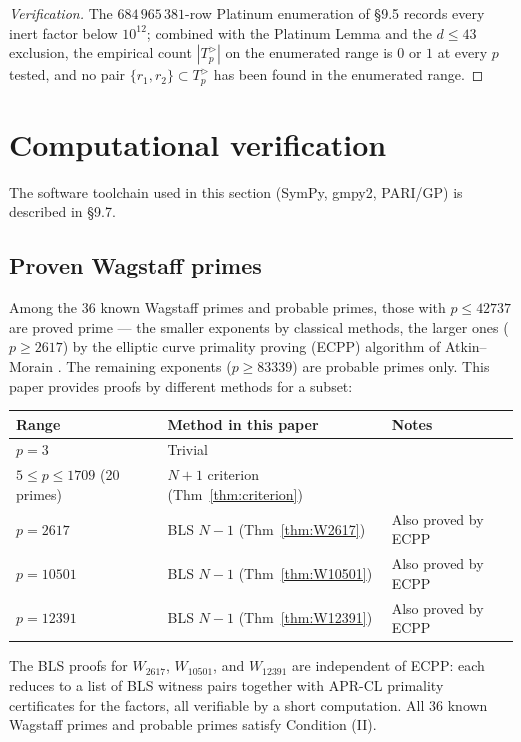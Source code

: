 \documentclass[12pt]{article}
\theoremstyle{plain}
\theoremstyle{definition}
\theoremstyle{remark}
\begin{document}
\begin{proof}[Verification]
The \(684\,965\,381\)-row Platinum enumeration of \S9.5 records
every inert factor below \(10^{12}\); combined with the
Platinum Lemma and the \(d \leq 43\) exclusion, the empirical
count \(|T_p^{>}|\) on the enumerated range is \(0\) or \(1\) at every
\(p\) tested, and no pair \(\{r_1, r_2\} \subset T_p^{>}\) has
been found in the enumerated range.
\end{proof}

\section{Computational verification}


The software toolchain used in this section (SymPy, gmpy2,
PARI/GP) is described in \S9.7.

\subsection{Proven Wagstaff primes}


Among the 36 known Wagstaff primes and probable primes, those with
\(p \leq 42737\) are proved prime --- the smaller exponents by
classical methods, the larger ones (\(p \geq 2617\)) by the
elliptic curve primality proving (ECPP) algorithm of Atkin--Morain
\cite{ref1}. The remaining exponents (\(p \geq 83339\)) are
probable primes only. This paper provides proofs by different
methods for a subset:

\begin{center}
\begin{tabular}{lll}
\hline
Range & Method in this paper & Notes \\
\hline
\(p = 3\) & Trivial &  \\
\(5 \leq p \leq 1709\) (20 primes) & \(N+1\) criterion (Thm~\ref{thm:criterion}) &  \\
\(p = 2617\) & BLS \(N-1\) (Thm~\ref{thm:W2617}) & Also proved by ECPP \\
\(p = 10501\) & BLS \(N-1\) (Thm~\ref{thm:W10501}) & Also proved by ECPP \\
\(p = 12391\) & BLS \(N-1\) (Thm~\ref{thm:W12391}) & Also proved by ECPP \\
\hline
\end{tabular}
\end{center}


The BLS proofs for \(W_{2617}\), \(W_{10501}\), and \(W_{12391}\)
are independent of ECPP: each reduces to a list of BLS witness
pairs together with APR-CL primality certificates for the
factors, all verifiable by a short computation.
All 36 known Wagstaff primes and probable primes satisfy Condition (II).
\end{document}
